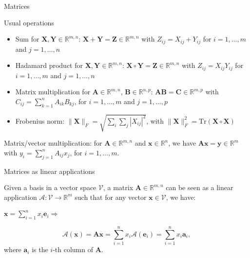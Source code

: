 \documentclass[aspectratio=1610]{beamer}
\begin{document}
\begin{frame}{Matrices}
  \begin{block}{Usual operations}
    \begin{itemize}
      \item Sum for $\mathbf{X},\mathbf{Y}\in\mathbb{R}^{m,n}$: $\mathbf{X} + \mathbf{Y} = \mathbf{Z}\in\mathbb{R}^{m,n}$ with $Z_{ij} = X_{ij} + Y_{ij}$ for $i=1,\dots,m$ and $j=1,\dots,n$
      \item Hadamard product for $\mathbf{X},\mathbf{Y}\in\mathbb{R}^{m,n}$: $\mathbf{X}\circ\mathbf{Y} = \mathbf{Z}\in\mathbb{R}^{m,n}$ with $Z_{ij} = X_{ij}Y_{ij}$ for $i=1,\dots,m$ and $j=1,\dots,n$
      \item Matrix multiplication for $\mathbf{A}\in\mathbb{R}^{m,n}$, $\mathbf{B}\in\mathbb{R}^{n,p}$: $\mathbf{A}\mathbf{B}=\mathbf{C}\in\mathbb{R}^{m,p}$ with $C_{ij} = \sum_{k=1}^n A_{ik}B_{kj}$, for $i=1,\dots,m$ and $j=1,\dots,p$
      \item Frobenius norm: $\|\mathbf{X}\|_F = \sqrt{\sum\limits_i\sum\limits_j |X_{ij}|^2}$, with $\|\mathbf{X}\|_F^2 = \mathrm{Tr}\left(\mathbf{X}\circ\mathbf{X}\right)$
    \end{itemize}
  \end{block}

  Matrix/vector multiplication: for $\mathbf{A}\in\mathbb{R}^{m,n}$ and $\mathbf{x}\in\mathbb{R}^n$, we have $\mathbf{A}\mathbf{x} = \mathbf{y}\in\mathbb{R}^m$ with $y_i = \sum_{j=1}^n A_{ij}x_j$, for $i=1,\dots,m$.
\end{frame}

\begin{frame}{Matrices as linear applications}

  Given a basis in a vector space $\mathcal{V}$, a matrix $\mathbf{A}\in\mathbb{R}^{m,n}$ can be seen as a linear application $\mathcal{A}:\mathcal{V}\to\mathbb{R}^m$ such that for any vector $\mathbf{x}\in\mathcal{V}$, we have:
    
    $\mathbf{x} = \sum_{i=1}^n x_i \mathbf{e}_i \Rightarrow$

    $$\mathcal{A}(\mathbf{x}) = \mathbf{A}\mathbf{x} = \sum_{i=1}^n x_i \mathcal{A}(\mathbf{e}_i) = \sum_{i=1}^n x_i \mathbf{a}_i, $$
    where $\mathbf{a}_i$ is the $i$-th column of $\mathbf{A}$.
\end{frame}
\end{document}
